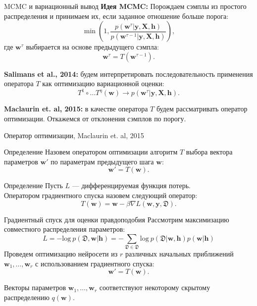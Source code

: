 \documentclass[usenames,dvipsnames,10pt,pdf,utf8,russian,aspectratio=43]{beamer}
\begin{document}
\begin{frame}{MCMC и вариационный вывод}
\textbf{Идея MCMC:}
Порождаем сэмплы из простого распределения и принимаем их, если заданное отношение больше порога:
\[
    \min\left(1, \frac{p(\mathbf{w}^{\tau}|\mathbf{y}, \mathbf{X}, \mathbf{h})}{p(\mathbf{w}^{\tau - 1}|\mathbf{y}, \mathbf{X}, \mathbf{h})}\right),
\]
где $\mathbf{w}^{\tau}$ выбирается на основе предыдущего сэмпла:
\[
    \mathbf{w}^{\tau} = T(\mathbf{w}^{\tau - 1}).
\]

\textbf{Salimans et al., 2014:} будем интерпретировать последовательность применения оператора $T$ как оптимизацию вариационной оценки:
\[
    T^1 \circ \dots T^\eta(\mathbf{w}) \to p(\mathbf{w}^{\tau}|\mathbf{y}, \mathbf{X}, \mathbf{h}).
\]

\textbf{Maclaurin et. al, 2015:}  в качестве оператора $T$ будем рассматривать оператор оптимизации. Откажемся от отклонения сэмплов по порогу.
\end{frame}


\begin{frame}{Оператор оптимизации, Maclaurin et. al, 2015}
\begin{block}{Определение}
Назовем оператором оптимизации алгоритм $T$ выбора вектора параметров $\mathbf{w}'$  по параметрам предыдущего шага $\mathbf{w}$:
\[
	\mathbf{w}' = T(\mathbf{w}).
\]
\end{block}

\begin{block}{Определение}
Пусть $L$ --- дифференцируемая функция потерь. \\
Оператором градиентного спуска назовем следующий оператор:
\[
    T(\mathbf{w}) = \mathbf{w} - \beta \nabla L(\mathbf{w}, \mathbf{y}, \mathfrak{D}).
\]
\end{block}


\end{frame}

\begin{frame}{Градиентный спуск для оценки правдоподобия}
Рассмотрим максимизацию совместного распределения параметров:
\[
    L =  -\text{log}~p(\mathfrak{D},\mathbf{w}|\mathbf{h}) = -\sum_{\mathfrak{D} \in \mathfrak{D}} \text{log}~p(\mathfrak{D}|\mathbf{w}, \mathbf{h}) p(\mathbf{w}|\mathbf{h})
\]
Проведем оптимизацию нейросети  из $r$ различных начальных приближений $\mathbf{w}_1, \dots, \mathbf{w}_r$ с использованием градиентного спуска:
\[
\mathbf{w}' = T(\mathbf{w}).
\]

Векторы параметров $\mathbf{w}_1,\dots,\mathbf{w}_r$ соответствуют некоторому скрытому распределению $q(\mathbf{w})$.

\end{frame}
\end{document}
